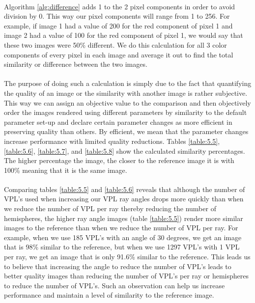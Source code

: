\paragraph{}
Algorithm \ref{alg:difference} adds 1 to the 2 pixel components in order to avoid division by 0.  This way our pixel components will range from 1 to 256.  For example, if image 1 had a value of 200 for the red component of pixel 1 and image 2 had a value of 100 for the red component of pixel 1, we would say that these two images were 50\% different.  We do this calculation for all 3 color components of every pixel in each image and average it out to find the total similarity or difference between the two images.

\paragraph{}
The purpose of doing such a calculation is simply due to the fact that quantifying the quality of an image or  the similarity with another image is rather subjective.  This way we can assign an objective value to the comparison and then objectively order the images rendered using different parameters by similarity to the default parameter set-up and declare certain parameter changes as more efficient in preserving quality than others.  By efficient, we mean that the parameter changes increase performance with limited quality reductions.  Tables \ref{table:5.5}, \ref{table:5.6}, \ref{table:5.7}, and \ref{table:5.8} show the calculated similarity percentages.  The higher percentage the image, the closer to the reference image it is with 100\% meaning that it is the same image.

\paragraph{}
Comparing tables \ref{table:5.5} and \ref{table:5.6} reveals that although the number of VPL's used when increasing our VPL ray angles drops more quickly than when we reduce the number of VPL per ray thereby reducing the number of hemispheres, the higher ray angle images (table \ref{table:5.5}) render more similar images to the reference than when we reduce the number of VPL per ray.  For example, when we use 185 VPL's with an angle of 30 degrees, we get an image that is 98\% similar to the reference, but when we use 1297 VPL's with 1 VPL per ray, we get an image that is only 91.6\% similar to the reference.  This leads us to believe that increasing the angle to reduce the number of VPL's leads to better quality images than reducing the number of VPL's per ray or hemispheres to reduce the number of VPL's.  Such an observation can help us increase performance and maintain a level of similarity to the reference image.


